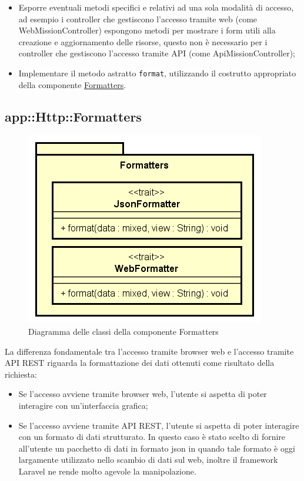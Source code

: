 \begin{itemize}
	\item Esporre eventuali metodi specifici e relativi ad una sola modalità di accesso, ad esempio i controller che gestiscono l'accesso tramite web (come WebMissionController) espongono metodi per mostrare i form utili alla creazione e aggiornamento delle risorse, questo non è necessario per i controller che gestiscono l'accesso tramite API (come ApiMissionController);
	\item Implementare il metodo astratto \verb!format!, utilizzando il costrutto appropriato della componente \hyperlink{formatters}{Formatters}.
\end{itemize} 

\hypertarget{formatters}{} %
\subsection{app::Http::Formatters} 
\begin{figure}[H]
	\centering
  \includegraphics[scale=0.8]{immagini/components/formatters_diagram.png}
  \caption{Diagramma delle classi della componente Formatters}
	\label{fig:formatters} 
\end{figure}

La differenza fondamentale tra l'accesso tramite browser web e l'accesso tramite API REST riguarda la formattazione dei dati ottenuti come risultato della richiesta: 
\begin{itemize}
	\item Se l'accesso avviene tramite browser web, l'utente si aspetta di poter interagire con un'interfaccia grafica;
	\item Se l'accesso avviene tramite API REST, l'utente si aspetta di poter interagire con un formato di dati strutturato. In questo caso è stato scelto di fornire all'utente un pacchetto di dati in formato \gls{json}\glsfirstoccur{} in quando tale formato è oggi largamente utilizzato nello scambio di dati sul web, inoltre il framework Laravel ne rende molto agevole la manipolazione.
\end{itemize} 

